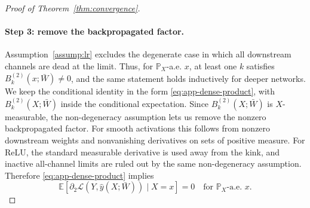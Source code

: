 \documentclass{article}
\newcommand{\E}{\mathbb{E}}
\newcommand{\Pp}{\mathbb{P}}
\newcommand{\calL}{\mathcal{L}}
\begin{document}
\begin{proof}[Proof of Theorem~\ref{thm:convergence}]
\paragraph{Step 3: remove the backpropagated factor.}
Assumption~\ref{assump:lr} excludes the degenerate case in which all downstream channels are dead at the limit. Thus, for $\Pp_X$-a.e. $x$, at least one $k$ satisfies $B_k^{(2)}(x;\bar W)\ne0$, and the same statement holds inductively for deeper networks. We keep the conditional identity in the form \eqref{eq:app-dense-product}, with $B_k^{(2)}(X;\bar W)$ inside the conditional expectation. Since $B_k^{(2)}(X;\bar W)$ is $X$-measurable, the non-degeneracy assumption lets us remove the nonzero backpropagated factor. For smooth activations this follows from nonzero downstream weights and nonvanishing derivatives on sets of positive measure. For ReLU, the standard measurable derivative is used away from the kink, and inactive all-channel limits are ruled out by the same non-degeneracy assumption. Therefore \eqref{eq:app-dense-product} implies
\begin{equation}
\E\!\left[
\partial_2\calL(Y,\hat y(X;\bar W))
\mid X=x
\right]=0
\quad\text{for }\Pp_X\text{-a.e. }x.
\label{eq:app-conditional-zero}
\end{equation}


\end{proof}
\end{document}
